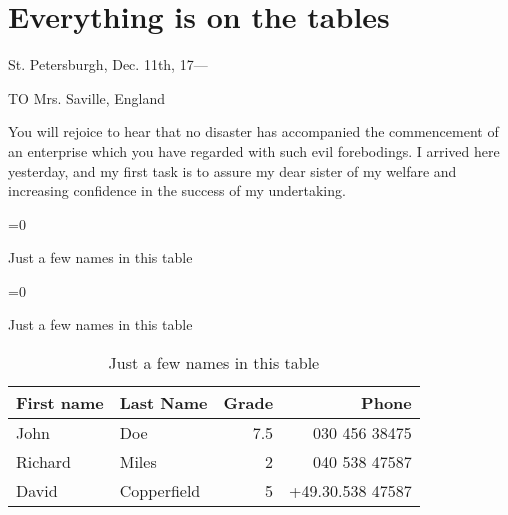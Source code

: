 \section{Everything is on the tables}
St. Petersburgh, Dec. 11th, 17---

TO Mrs. Saville, England

You will rejoice to hear that no disaster has accompanied the commencement of an enterprise which you have regarded with such evil forebodings. I arrived here yesterday, and my first task is to assure my dear sister of my welfare and increasing confidence in the success of my undertaking.
\noindent
\begin{table}
	\ifnum{}=0 
		\caption*{Just a few names in this table}
	\else
		\ifnum{}=0 
			\caption*{Just a few names in this table}
		\else
			\caption{Just a few names in this table} 
		\fi
	\fi
	\begin{center}
		\begin{tabular}{llrr}
			\toprule
			First name & Last Name & Grade & Phone \\
			\midrule
			John & Doe & 7.5 & 030 456 38475 \\
			Richard & Miles & 2 & 040 538 47587 \\
			David & Copperfield & 5 & +49.30.538 47587 \\
			\bottomrule
		\end{tabular}
	\end{center}
\end{table}
